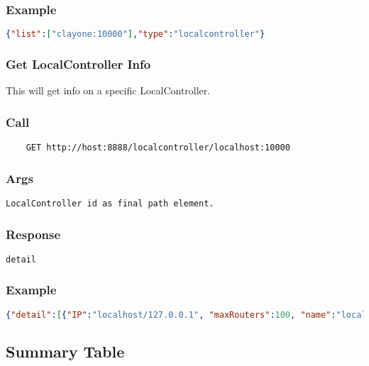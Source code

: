 \subsubsection*{Example}
\begin{lstlisting}[language=json]
{"list":["clayone:10000"],"type":"localcontroller"}
\end{lstlisting}

\hr
\subsubsection{Get LocalController Info}
This will get info on a specific LocalController.
\subsubsection*{Call}
\begin{verbatim}
	GET http://host:8888/localcontroller/localhost:10000
\end{verbatim}

\subsubsection*{Args}
\begin{verbatim}
LocalController id as final path element.
\end{verbatim}

\subsubsection*{Response}
\begin{verbatim}
detail
\end{verbatim}

\subsubsection*{Example}
\begin{lstlisting}[language=json]
{"detail":[{"IP":"localhost/127.0.0.1", "maxRouters":100, "name":"localhost:10000", "noRouters":0, "port":10000, "routers":[], "status":"ONLINE", "usage":0}], "list":["localhost:10000"], "type":"localcontroller"}

\end{lstlisting}



\subsection{Summary Table}


